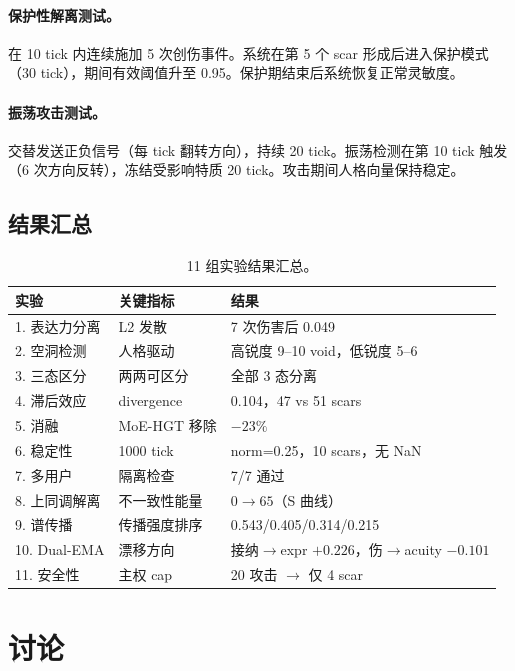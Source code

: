 \documentclass[11pt]{article}
\begin{document}
\paragraph{保护性解离测试。}在 10 tick 内连续施加 5 次创伤事件。系统在第 5 个 scar 形成后进入保护模式（30 tick），期间有效阈值升至 0.95。保护期结束后系统恢复正常灵敏度。

\paragraph{振荡攻击测试。}交替发送正负信号（每 tick 翻转方向），持续 20 tick。振荡检测在第 10 tick 触发（6 次方向反转），冻结受影响特质 20 tick。攻击期间人格向量保持稳定。

\subsection{结果汇总}

\begin{table}[H]
\centering
\small
\caption{11 组实验结果汇总。}
\label{tab:results}
\begin{tabular}{llp{5cm}}
\toprule
\textbf{实验} & \textbf{关键指标} & \textbf{结果} \\
\midrule
1. 表达力分离 & L2 发散 & 7 次伤害后 0.049 \\
2. 空洞检测 & 人格驱动 & 高锐度 9--10 void，低锐度 5--6 \\
3. 三态区分 & 两两可区分 & 全部 3 态分离 \\
4. 滞后效应 & divergence & 0.104，47 vs 51 scars \\
5. 消融 & MoE-HGT 移除 & $-23\%$ \\
6. 稳定性 & 1000 tick & norm=0.25，10 scars，无 NaN \\
7. 多用户 & 隔离检查 & 7/7 通过 \\
8. 上同调解离 & 不一致性能量 & $0 \to 65$（S 曲线） \\
9. 谱传播 & 传播强度排序 & 0.543/0.405/0.314/0.215 \\
10. Dual-EMA & 漂移方向 & 接纳$\to$expr $+0.226$，伤$\to$acuity $-0.101$ \\
11. 安全性 & 主权 cap & 20 攻击 $\to$ 仅 4 scar \\
\bottomrule
\end{tabular}
\end{table}

\section{讨论}
\label{sec:discussion}
\end{document}
